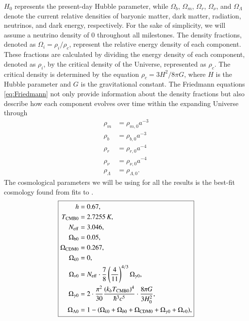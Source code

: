 \documentclass{aa}
\begin{document}
$H_0$ represents the present-day Hubble parameter, while $\Omega_b$, $\Omega_m$, $\Omega_r$, $\Omega_\nu$, and $\Omega_\Lambda$ denote the current relative densities of baryonic matter, dark matter, radiation, neutrinos, and dark energy, respectively. For the sake of simplicity, we will assume a neutrino density of 0 throughout all milestones. The density fractions, denoted as $\Omega_i = \rho_i /\rho_c$, represent the relative energy density of each component. These fractions are calculated by dividing the energy density of each component, denoted as $\rho_i$, by the critical density of the Universe, represented as $\rho_c$. The critical density is determined by the equation $\rho_c = 3H^2/8\pi G$, where $H$ is the Hubble parameter and $G$ is the gravitational constant. The Friedmann equations \eqref{eq:Friedmann} not only provide information about the density fractions but also describe how each component evolves over time within the expanding Universe through
\begin{align}\label{eq: dens}
    \rho_m &= \rho_{m,0} a^{-3}\\ 
    \rho_b &= \rho_{b,0} a^{-3}\\
    \rho_r &= \rho_{r,0} a^{-4}\\
    \rho_\nu &= \rho_{\nu,0} a^{-4}\\
    \rho_\Lambda &= \rho_{\Lambda,0}.
\end{align}
The cosmological parameters we will be using for all the results is the best-fit cosmology found from fits to \cite{2}.
\begin{equation}
      \boxed{
   \begin{aligned}
      h &= 0.67, \\
      T_{\rm CMB 0} &= 2.7255\,K, \\
      N_{\rm eff} &= 3.046, \\
      \Omega_{\rm b 0} &= 0.05, \\
      \Omega_{\rm CDM 0} &= 0.267,\\
      \Omega_{k 0} &= 0, \\
      \Omega_{\nu 0} &= N_{\rm eff}\cdot \frac{7}{8}\left(\frac{4}{11}\right)^{4/3}\Omega_{\gamma 0}, \\
      \Omega_{\gamma 0} &= 2\cdot \frac{\pi^2}{30} \frac{(k_bT_{\rm CMB 0})^4}{\hbar^3 c^5} \cdot \frac{8\pi G}{3H_0^2},\\
      \Omega_{\Lambda 0} &= 1 - (\Omega_{k 0}+\Omega_{b 0}+\Omega_{\rm CDM 0}+\Omega_{\gamma 0}+\Omega_{\nu 0}),
   \end{aligned}}
\end{equation}
\end{document}
